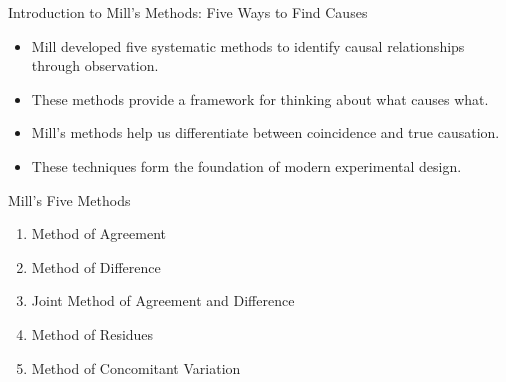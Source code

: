 \documentclass{beamer}
\begin{document}
\begin{frame}{Introduction to Mill's Methods: Five Ways to Find Causes}
    \begin{itemize}
        \item Mill developed five systematic methods to identify causal relationships through observation.
        \item These methods provide a framework for thinking about what causes what.
        \item Mill's methods help us differentiate between coincidence and true causation.
        \item These techniques form the foundation of modern experimental design.
    \end{itemize}
    
    \begin{block}{Mill's Five Methods}
        \begin{enumerate}
            \item Method of Agreement
            \item Method of Difference
            \item Joint Method of Agreement and Difference
            \item Method of Residues
            \item Method of Concomitant Variation
        \end{enumerate}
    \end{block}
\end{frame}
\end{document}
